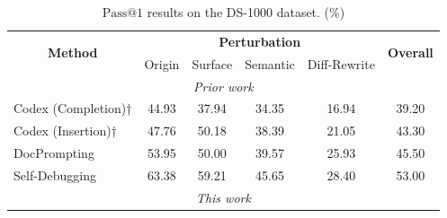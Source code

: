\documentclass[a4paper,oneside]{book}
\begin{document}
\begin{table}[H]
    \caption{$\text{Pass@1}$ results on the DS-1000 dataset. (\%)}\label{tab:ds1000_results}
    \begin{center}
        \begin{tabular}{|lccccc|}
            \hline
            \multicolumn{1}{|c|}{\multirow{2}{*}{\textbf{Method}}} & \multicolumn{4}{c|}{\textbf{Perturbation}} & \multirow{2}{*}{\textbf{Overall}}                                                                                                \\ \cline{2-5}
            \multicolumn{1}{|c|}{}                                 & \multicolumn{1}{l|}{Origin}                & \multicolumn{1}{l|}{Surface}        & \multicolumn{1}{l|}{Semantic}       & \multicolumn{1}{l|}{Diff-Rewrite}   &                \\ \hline
            \multicolumn{6}{|c|}{\textit{Prior work}}                                                                                                                                                                                              \\ \hline
            \multicolumn{1}{|l|}{Codex (Completion)†}              & \multicolumn{1}{c|}{44.93}                 & \multicolumn{1}{c|}{37.94}          & \multicolumn{1}{c|}{34.35}          & \multicolumn{1}{c|}{16.94}          & 39.20          \\ \hline
            \multicolumn{1}{|l|}{Codex (Insertion)†}               & \multicolumn{1}{c|}{47.76}                 & \multicolumn{1}{c|}{50.18}          & \multicolumn{1}{c|}{38.39}          & \multicolumn{1}{c|}{21.05}          & 43.30          \\ \hline
            \multicolumn{1}{|l|}{DocPrompting}                     & \multicolumn{1}{c|}{53.95}                 & \multicolumn{1}{c|}{50.00}          & \multicolumn{1}{c|}{39.57}          & \multicolumn{1}{c|}{25.93}          & 45.50          \\ \hline
            \multicolumn{1}{|l|}{Self-Debugging}                   & \multicolumn{1}{c|}{63.38}                 & \multicolumn{1}{c|}{59.21}          & \multicolumn{1}{c|}{45.65}          & \multicolumn{1}{c|}{28.40}          & 53.00          \\ \hline
            \multicolumn{6}{|c|}{\textit{This work}}                                                                                                                                                                                               \\ \hline

\end{tabular}
\end{center}
\end{table}
\end{document}

